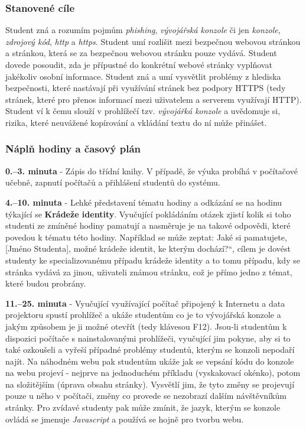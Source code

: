 \documentclass[a4paper, 12pt]{article}
\providecommand{\uv}[1]{\quotedblbase #1\textquotedblleft}
\begin{document}
\subsubsection{Stanovené cíle}
Student zná a rozumím pojmům \textit{phishing}, \textit{vývojářská konzole} či jen \textit{konzole}, \textit{zdrojový kód}, \textit{http} a \textit{https}. Student umí rozlišit mezi bezpečnou webovou stránkou a stránkou, která se za bezpečnou webovou stránku pouze vydává. Student dovede posoudit, zda je přípustné do konkrétní webové stránky vyplňovat jakékoliv osobní informace. Student zná a umí vysvětlit problémy z hlediska bezpečnosti, které nastávají při využívání stránek bez podpory HTTPS (tedy stránek, které pro přenos informací mezi uživatelem a serverem využívají HTTP). Student ví k čemu slouží v prohlížečí tzv. \textit{vývojářká konzole} a uvědomuje si, rizika, které neuvážené kopírování a vkládání textu do ní může přinášet.

\subsubsection{Náplň hodiny a časový plán}
\indent\textbf{0.--3. minuta} - Zápis do třídní knihy. V případě, že výuka probíhá v počítačové učebně, zapnutí počítačů a přihlášení studentů do systému.

\textbf{4.--10. minuta} - Lehké představení tématu hodiny a odkázání se na hodinu týkající se \textbf{Krádeže identity}. Vyučující pokládáním otázek zjistí kolik si toho studenti ze zmíněné hodiny pamatují a nasměruje je na takové odpovědi, které povedou k tématu této hodiny. Například se může zeptat: \uv{Jaké si pamatujete, [Jméno Studenta], možné krádeže identit, ke kterým dochází?}, cílem je dovést studenty ke specializovanému případu krádeže identity a to tomu případu, kdy se stránka vydává za jinou, uživateli známou stránku, což je přímo jedno z témat, které budou probrány.

\textbf{11.--25. minuta} - Vyučující využívající počítač připojený k Internetu a data projektoru spustí prohlížeč a ukáže studentům co je to vývojářská konzole a jakým způsobem je ji možné otevřít (tedy klávesou F12). Jsou-li studentům k dispozici počítače s nainstalovanými prohlížeči, vyučující jim pokyne, aby si to také ozkoušeli a vyřeší případné problémy studentů, kterým se konzoli nepodaří najít. Na náhodném webu pak studentům ukáže jak se vepsání kódu do konzole na webu projeví - nejprve na jednoduchém příkladu (vyskakovací okénko), potom na složitějším (úprava obsahu stránky). Vysvětlí jim, že tyto změny se projevují pouze u něho v počítači, změny co provede se nezobrazí dalším návštěvníkům stránky. Pro zvídavé studenty pak může zmínit, že jazyk, kterým se konzole ovládá se jmenuje \textit{Javascript} a používá se hojně pro tvorbu webu. 
\end{document}
